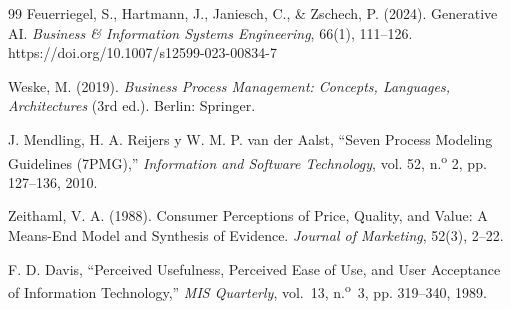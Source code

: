 \begin{thebibliography}{99}
Feuerriegel, S., Hartmann, J., Janiesch, C., \& Zschech, P. (2024).
Generative AI.
\textit{Business \& Information Systems Engineering}, 66(1), 111--126.
https://doi.org/10.1007/s12599-023-00834-7

Weske, M. (2019).
\textit{Business Process Management: Concepts, Languages, Architectures} (3rd ed.).
Berlin: Springer.

J. Mendling, H. A. Reijers y W. M. P. van der Aalst, ``Seven Process Modeling Guidelines (7PMG),'' \textit{Information and Software Technology}, vol. 52, n.\textsuperscript{o} 2, pp. 127--136, 2010.

Zeithaml, V. A. (1988).
Consumer Perceptions of Price, Quality, and Value: A Means-End Model and Synthesis of Evidence.
\textit{Journal of Marketing}, 52(3), 2--22.

F. D. Davis, ``Perceived Usefulness, Perceived Ease of Use, and User Acceptance of Information Technology,'' \textit{MIS Quarterly}, vol.~13, n.\textsuperscript{o}~3, pp. 319--340, 1989.

\end{thebibliography}
